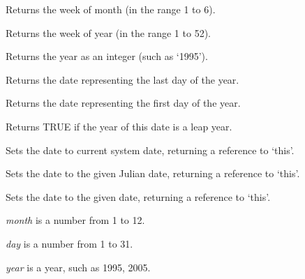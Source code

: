 \label{wxdategetweekofmonth}


Returns the week of month (in the range 1 to 6).

\label{wxdategetweekofyear}


Returns the week of year (in the range 1 to 52).

\label{wxdategetyear}


Returns the year as an integer (such as `1995').

\label{wxdategetyearend}


Returns the date representing the last day of the year.

\label{wxdategetyearstart}


Returns the date representing the first day of the year.

\label{wxdateisleapyear}


Returns TRUE if the year of this date is a leap year.

\label{wxdateset}


Sets the date to current system date, returning a reference to `this'.


Sets the date to the given Julian date, returning a reference to `this'.


Sets the date to the given date, returning a reference to `this'.

{\it month} is a number from 1 to 12.

{\it day} is a number from 1 to 31.

{\it year} is a year, such as 1995, 2005.

\label{wxdatesetformat}

